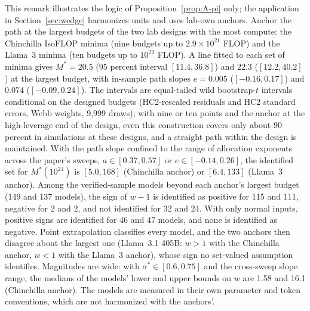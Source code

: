 \begin{remark}\label{rem:A-pi-illus}
This remark illustrates the logic of Proposition~\ref{prop:A-pi} only; the application in Section~\ref{sec:wedge}
harmonizes units and uses lab-own anchors. Anchor the path at the largest budgets of the two lab designs with the most
compute: the Chinchilla IsoFLOP minima (nine budgets up to $2.9\times10^{21}$ FLOP) and the Llama~3 minima (ten budgets up
to $10^{22}$ FLOP). A line fitted to each set of minima gives $M^*=20.5$ (95 percent interval $[11.4,36.8]$) and $22.3$
($[12.2,40.2]$) at the largest budget, with in-sample path slopes $e=0.005$ ($[-0.16,0.17]$) and $0.074$ ($[-0.09,0.24]$).
The intervals are equal-tailed wild bootstrap-$t$ intervals conditional on the designed budgets (HC2-rescaled residuals and
HC2 standard errors, Webb weights, 9,999 draws); with nine or ten points and the anchor at the high-leverage end of the
design, even this construction covers only about 90 percent in simulations at these designs, and a straight path within
the design is maintained. With the path slope confined to the range of allocation exponents across the paper's sweeps,
$a\in[0.37,0.57]$ or $e\in[-0.14,0.26]$, the identified set for $M^*(10^{24})$ is $[5.0,168]$ (Chinchilla anchor) or
$[6.4,133]$ (Llama~3 anchor). Among the verified-sample models beyond each anchor's largest budget (149 and 137 models),
the sign of $w-1$ is identified as positive for 115 and 111, negative for 2 and 2, and not identified for 32 and 24. With
only normal inputs, positive signs are identified for 46 and 47 models, and none is identified as negative. Point
extrapolation classifies every model, and the two anchors then disagree about the largest one (Llama~3.1 405B: $w>1$ with
the Chinchilla anchor, $w<1$ with the Llama~3 anchor), whose sign no set-valued assumption identifies. Magnitudes are
wide: with $\sigma^*\in[0.6,0.75]$ and the cross-sweep slope range, the medians of the models' lower and upper bounds on
$w$ are 1.58 and 16.1 (Chinchilla anchor). The models are measured in their own parameter and token conventions, which are
not harmonized with the anchors'.
\end{remark}

